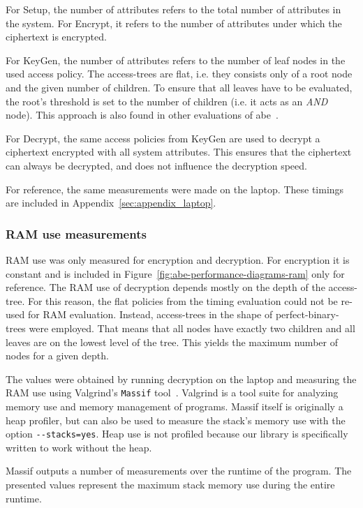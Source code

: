 For Setup, the number of attributes refers to the total number of attributes in the system.
For Encrypt, it refers to the number of attributes under which the ciphertext is encrypted.

For KeyGen, the number of attributes refers to the number of leaf nodes in the used access policy.
The \glspl{access-tree} are flat, i.e. they consists only of a root node and the given number of children.
To ensure that all leaves have to be evaluated, the root's threshold is set to the number of children (i.e. it acts as an \emph{AND} node).
This approach is also found in other evaluations of \acrshort{abe}~\cite{girgenti_feasibility_2019}.

For Decrypt, the same access policies from KeyGen are used to decrypt a ciphertext encrypted with all system attributes.
This ensures that the ciphertext can always be decrypted, and does not influence the decryption speed.

For reference, the same measurements were made on the laptop.
These timings are included in Appendix~\ref{sec:appendix_laptop}.

\subsubsection{RAM use measurements}


RAM use was only measured for encryption and decryption. 
For encryption it is constant and is included in Figure~\ref{fig:abe-performance-diagrams-ram} only for reference.
The RAM use of decryption depends mostly on the depth of the \gls{access-tree}.
For this reason, the flat policies from the timing evaluation could not be re-used for RAM evaluation.
Instead, \glspl{access-tree} in the shape of \glspl{perfect-binary-tree} were employed.
That means that all nodes have exactly two children and all leaves are on the lowest level of the tree.
This yields the maximum number of nodes for a given depth.

The values were obtained by running decryption on the laptop and measuring the RAM use using Valgrind's \texttt{Massif} tool~\cite{nethercote_massif_nodate}.
Valgrind is a tool suite for analyzing memory use and memory management of programs.
Massif itself is originally a heap profiler, but can also be used to measure the stack's memory use with the option \verb+--stacks=yes+.
Heap use is not profiled because our library is specifically written to work without the heap.

Massif outputs a number of measurements over the runtime of the program. 
The presented values represent the maximum stack memory use during the entire runtime.

